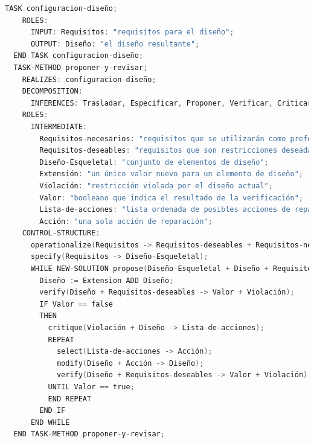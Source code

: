 \newpage

\begin{lstlisting}[language=C,caption=\textbf{Código de la plantilla de configuración}]
  TASK configuracion-diseño;
    ROLES:
      INPUT: Requisitos: "requisitos para el diseño";
      OUTPUT: Diseño: "el diseño resultante";
  END TASK configuracion-diseño;
  TASK-METHOD proponer-y-revisar;
    REALIZES: configuracion-diseño;
    DECOMPOSITION:
      INFERENCES: Trasladar, Especificar, Proponer, Verificar, Criticar, Seleccionar, Modificar;
    ROLES:
      INTERMEDIATE:
        Requisitos-necesarios: "requisitos que se utilizarán como preferencias (suaves)";
        Requisitos-deseables: "requisitos que son restricciones deseadas (estrictas)";
        Diseño-Esqueletal: "conjunto de elementos de diseño";
        Extensión: "un único valor nuevo para un elemento de diseño";
        Violación: "restricción violada por el diseño actual";
        Valor: "booleano que indica el resultado de la verificación";
        Lista-de-acciones: "lista ordenada de posibles acciones de reparación (fijación)";
        Acción: "una sola acción de reparación";
    CONTROL-STRUCTURE:
      operationalize(Requisitos -> Requisitos-deseables + Requisitos-necesarios);
      specify(Requisitos -> Diseño-Esqueletal);
      WHILE NEW-SOLUTION propose(Diseño-Esqueletal + Diseño + Requisitos-necesarios -> Extensión) DO
        Diseño := Extension ADD Diseño;
        verify(Diseño + Requisitos-deseables -> Valor + Violación);
        IF Valor == false
        THEN
          critique(Violación + Diseño -> Lista-de-acciones);
          REPEAT
            select(Lista-de-acciones -> Acción);
            modify(Diseño + Acción -> Diseño);
            verify(Diseño + Requisitos-deseables -> Valor + Violación);
          UNTIL Valor == true;
          END REPEAT
        END IF
      END WHILE
  END TASK-METHOD proponer-y-revisar;
\end{lstlisting}

